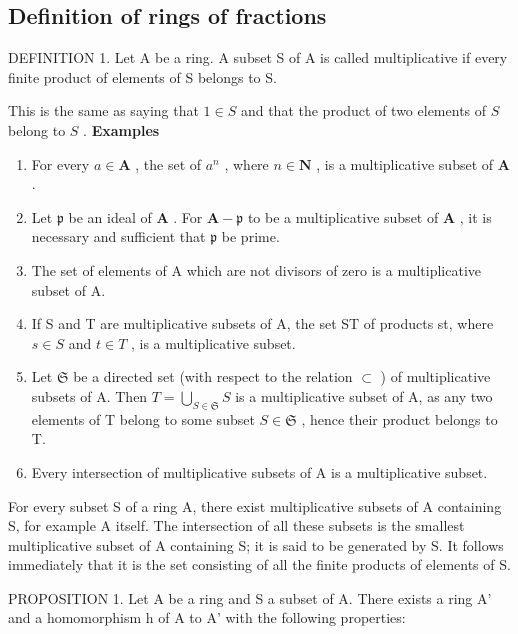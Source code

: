 \subsection{Definition of rings of fractions}

DEFINITION 1. Let A be a ring. A subset S of A is called multiplicative if every finite product of elements of S belongs to S.

This is the same as saying that \(1 \in S\) and that the product of two elements of \(S\) belong to \(S\) .
\relax{}
\textbf{Examples}\par

\begin{enumerate}
\def\labelenumi{(\arabic{enumi})}
\item
  For every \(a \in \mathbf{A}\) , the set of \(a^n\) , where \(n \in \mathbf{N}\) , is a multiplicative subset of \(\mathbf{A}\) .
\item
  Let \(\mathfrak{p}\) be an ideal of \(\mathbf{A}\) . For \(\mathbf{A} - \mathfrak{p}\) to be a multiplicative subset of \(\mathbf{A}\) , it is necessary and sufficient that \(\mathfrak{p}\) be prime.
\item
  The set of elements of A which are not divisors of zero is a multiplicative subset of A.
\item
  If S and T are multiplicative subsets of A, the set ST of products st, where \(s \in S\) and \(t \in T\) , is a multiplicative subset.
\item
  Let \(\mathfrak{S}\) be a directed set (with respect to the relation \(\subset\) ) of multiplicative subsets of A. Then \(T = \bigcup_{S \in \mathfrak{S}} S\) is a multiplicative subset of A, as any two elements of T belong to some subset \(S \in \mathfrak{S}\) , hence their product belongs to T.
\item
  Every intersection of multiplicative subsets of A is a multiplicative subset.
\end{enumerate}

For every subset S of a ring A, there exist multiplicative subsets of A containing S, for example A itself. The intersection of all these subsets is the smallest multiplicative subset of A containing S; it is said to be generated by S. It follows immediately that it is the set consisting of all the finite products of elements of S.

PROPOSITION 1. Let A be a ring and S a subset of A. There exists a ring A' and a homomorphism h of A to A' with the following properties:

